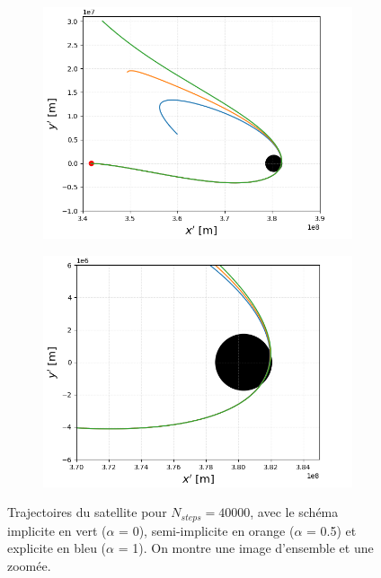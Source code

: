 \documentclass[a4paper,12pt,twoside]{article}
\begin{document}
\vspace{-0.1cm}

\begin{figure}[H]
\begin{subfigure}{0.45\textwidth}  %
    \centering  %
    \includegraphics[scale=0.4]{Graphes/Trajectoire_2.png}
\end{subfigure}
\hspace{0.05\textwidth}
\begin{subfigure}{0.45\textwidth}  %
    \centering  %
    \includegraphics[scale=0.4]{Graphes/Trajectoire_zoom_2.png}
\end{subfigure}
\captionsetup{justification=centering}
\caption{Trajectoires du satellite pour $N_{steps} = 40000$, avec le schéma implicite en vert ($\alpha$ = 0), semi-implicite en orange ($\alpha$ = 0.5) et explicite en bleu ($\alpha$ = 1). On montre une image d'ensemble et une zoomée.}
\label{fig3}
\end{figure}
\vspace{-1cm}
\end{document}
